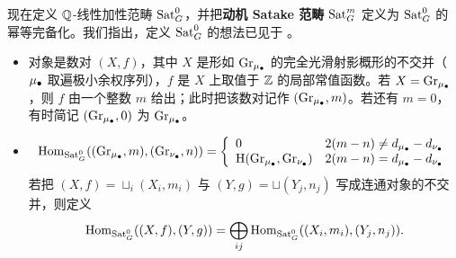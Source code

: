 现在定义 $\bQ$-线性加性范畴 $\Sat_G^{0}$，并把\textbf{动机 Satake 范畴} $\Sat_G^m$ 定义为 $\Sat_G^{0}$ 的幂等完备化。我们指出，定义 $\Sat_G^0$ 的想法已见于 \cite[\S 4.3]{FKK}。
\begin{itemize}
\item 对象是数对 $(X,f)$，其中 $X$ 是形如 $\Gr_\mmu$ 的完全光滑射影概形的不交并（$\mmu$ 取遍极小余权序列），$f$ 是 $X$ 上取值于 $\bZ$ 的局部常值函数。若 $X=\Gr_\mmu$，则 $f$ 由一个整数 $m$ 给出；此时把该数对记作 $(\Gr_\mmu,m)$。若还有 $m=0$，有时简记 $(\Gr_\mmu,0)$ 为 $\Gr_\mmu$。
\item \[\Hom_{\Sat_G^0}((\Gr_{\mmu},m),(\Gr_{\nu_\bullet},n))=\left\{\begin{array}{ll}0 & 2(m-n)\neq d_\mmu-d_{\nu_\bullet}\\
\on{H}(\Gr_{\mmu},\Gr_{\nu_\bullet}) & 2(m-n)=d_\mmu-d_{\nu_\bullet} \end{array}\right.\]
若把 $(X,f)=\sqcup_i (X_i,m_i)$ 与 $(Y,g)=\sqcup (Y_j,n_j)$ 写成连通对象的不交并，则定义
$$\Hom_{\Sat_G^0}((X,f),(Y,g))=\bigoplus_{ij}\Hom_{\Sat_G^0}((X_i,m_i),(Y_j,n_j)).$$
\end{itemize}
